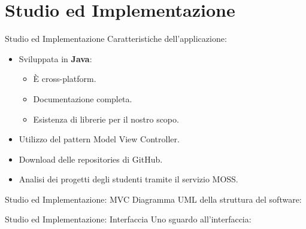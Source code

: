 \documentclass{beamer}
\begin{document}
	\section{Studio ed Implementazione}
	
	\begin{frame}{Studio ed Implementazione}
		Caratteristiche dell'applicazione:
		\begin{itemize}[<+->]
			\item Sviluppata in \textbf{Java}:
				\begin{itemize}[<+->]
					\item \`E cross-platform.
					\item Documentazione completa.
					\item Esistenza di librerie per il nostro scopo.
				\end{itemize}
			\item Utilizzo del pattern Model View Controller.
			\item Download delle repositories di GitHub.
			\item Analisi dei progetti degli studenti tramite il servizio MOSS.
		\end{itemize}
	\end{frame}
	
	\begin{frame}{Studio ed Implementazione: MVC}
		Diagramma UML della struttura del software:
		\begin{center}
		\end{center}
	\end{frame}
	
	
	\begin{frame}{Studio ed Implementazione: Interfaccia}
		\vspace{-0.2cm}
		Uno sguardo all'interfaccia:
		\begin{center}
		\end{center}
	\end{frame}

	
\end{document}
